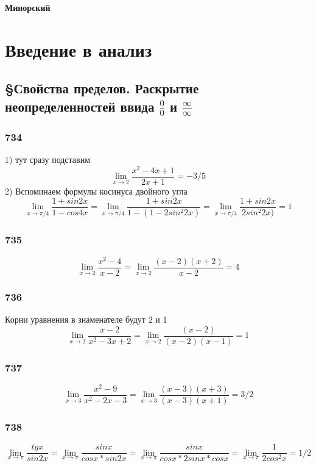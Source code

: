 \documentclass[12pt]{article}
\begin{document}
\begin{titlepage}
\begin{center}
\textbf{\huge Минорский}
\end{center}
\end{titlepage}
\tableofcontents
\newpage
\section{Введение в анализ}
\subsection{\S Свойства пределов. Раскрытие неопределенностей ввида $\frac{0}{0}$ и $\frac{\infty}{\infty}$}
\subsubsection{734}
1) тут сразу подставим
$$
\lim_{x\to 2} \frac{x^2-4x+1}{2x+1}= -3/5
$$
2) Вспоминаем формулы косинуса двойного угла
$$
\lim_{x\to \pi/4} \frac{1+sin2x}{1-cos4x}=
\lim_{x\to \pi/4} \frac{1+sin2x}{1-(1-2sin^{2}2x)}=
\lim_{x\to \pi/4} \frac{1+sin2x}{2sin^{2}2x)}=1
$$

\newpage
\subsubsection{735}
$$
\lim_{x\to 2} \frac{x^2-4}{x-2}=
\lim_{x\to 2} \frac{(x-2)(x+2)}{x-2}=4
$$

\newpage
\subsubsection{736}
Корни уравнения в знаменателе будут 2 и 1
$$
\lim_{x\to 2} \frac{x-2}{x^2-3x+2}=
\lim_{x\to 2} \frac{(x-2)}{(x-2)(x-1)}=1
$$

\newpage
\subsubsection{737}
$$
\lim_{x\to 3} \frac{x^2-9}{x^2-2x-3}=
\lim_{x\to 3} \frac{(x-3)(x+3)}{(x-3)(x+1)}=3/2
$$

\newpage
\subsubsection{738}
$$
\lim_{x\to \pi} \frac{tgx}{sin2x}=
\lim_{x\to \pi} \frac{sinx}{cosx*sin2x}=
\lim_{x\to \pi} \frac{sinx}{cosx*2sinx*cosx}=
\lim_{x\to \pi} \frac{1}{2cos^2 x}=1/2
$$

\newpage
\end{document}
